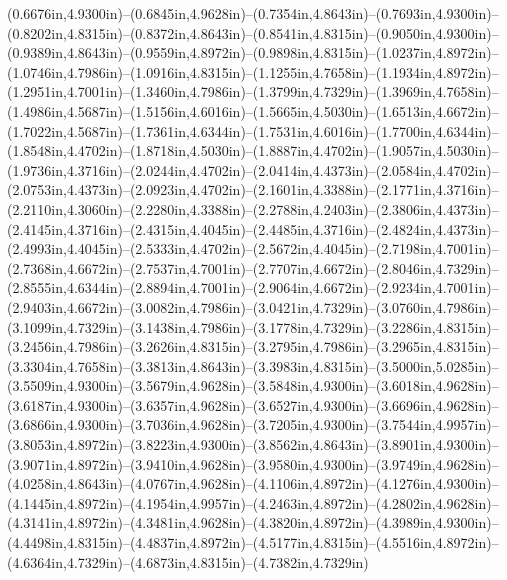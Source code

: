 (0.6676in,4.9300in)--(0.6845in,4.9628in)--(0.7354in,4.8643in)--(0.7693in,4.9300in)--(0.8202in,4.8315in)--(0.8372in,4.8643in)--(0.8541in,4.8315in)--(0.9050in,4.9300in)--(0.9389in,4.8643in)--(0.9559in,4.8972in)--(0.9898in,4.8315in)--(1.0237in,4.8972in)--(1.0746in,4.7986in)--(1.0916in,4.8315in)--(1.1255in,4.7658in)--(1.1934in,4.8972in)--(1.2951in,4.7001in)--(1.3460in,4.7986in)--(1.3799in,4.7329in)--(1.3969in,4.7658in)--(1.4986in,4.5687in)--(1.5156in,4.6016in)--(1.5665in,4.5030in)--(1.6513in,4.6672in)--(1.7022in,4.5687in)--(1.7361in,4.6344in)--(1.7531in,4.6016in)--(1.7700in,4.6344in)--(1.8548in,4.4702in)--(1.8718in,4.5030in)--(1.8887in,4.4702in)--(1.9057in,4.5030in)--(1.9736in,4.3716in)--(2.0244in,4.4702in)--(2.0414in,4.4373in)--(2.0584in,4.4702in)--(2.0753in,4.4373in)--(2.0923in,4.4702in)--(2.1601in,4.3388in)--(2.1771in,4.3716in)--(2.2110in,4.3060in)--(2.2280in,4.3388in)--(2.2788in,4.2403in)--(2.3806in,4.4373in)--(2.4145in,4.3716in)--(2.4315in,4.4045in)--(2.4485in,4.3716in)--(2.4824in,4.4373in)--(2.4993in,4.4045in)--(2.5333in,4.4702in)--(2.5672in,4.4045in)--(2.7198in,4.7001in)--(2.7368in,4.6672in)--(2.7537in,4.7001in)--(2.7707in,4.6672in)--(2.8046in,4.7329in)--(2.8555in,4.6344in)--(2.8894in,4.7001in)--(2.9064in,4.6672in)--(2.9234in,4.7001in)--(2.9403in,4.6672in)--(3.0082in,4.7986in)--(3.0421in,4.7329in)--(3.0760in,4.7986in)--(3.1099in,4.7329in)--(3.1438in,4.7986in)--(3.1778in,4.7329in)--(3.2286in,4.8315in)--(3.2456in,4.7986in)--(3.2626in,4.8315in)--(3.2795in,4.7986in)--(3.2965in,4.8315in)--(3.3304in,4.7658in)--(3.3813in,4.8643in)--(3.3983in,4.8315in)--(3.5000in,5.0285in)--(3.5509in,4.9300in)--(3.5679in,4.9628in)--(3.5848in,4.9300in)--(3.6018in,4.9628in)--(3.6187in,4.9300in)--(3.6357in,4.9628in)--(3.6527in,4.9300in)--(3.6696in,4.9628in)--(3.6866in,4.9300in)--(3.7036in,4.9628in)--(3.7205in,4.9300in)--(3.7544in,4.9957in)--(3.8053in,4.8972in)--(3.8223in,4.9300in)--(3.8562in,4.8643in)--(3.8901in,4.9300in)--(3.9071in,4.8972in)--(3.9410in,4.9628in)--(3.9580in,4.9300in)--(3.9749in,4.9628in)--(4.0258in,4.8643in)--(4.0767in,4.9628in)--(4.1106in,4.8972in)--(4.1276in,4.9300in)--(4.1445in,4.8972in)--(4.1954in,4.9957in)--(4.2463in,4.8972in)--(4.2802in,4.9628in)--(4.3141in,4.8972in)--(4.3481in,4.9628in)--(4.3820in,4.8972in)--(4.3989in,4.9300in)--(4.4498in,4.8315in)--(4.4837in,4.8972in)--(4.5177in,4.8315in)--(4.5516in,4.8972in)--(4.6364in,4.7329in)--(4.6873in,4.8315in)--(4.7382in,4.7329in)
